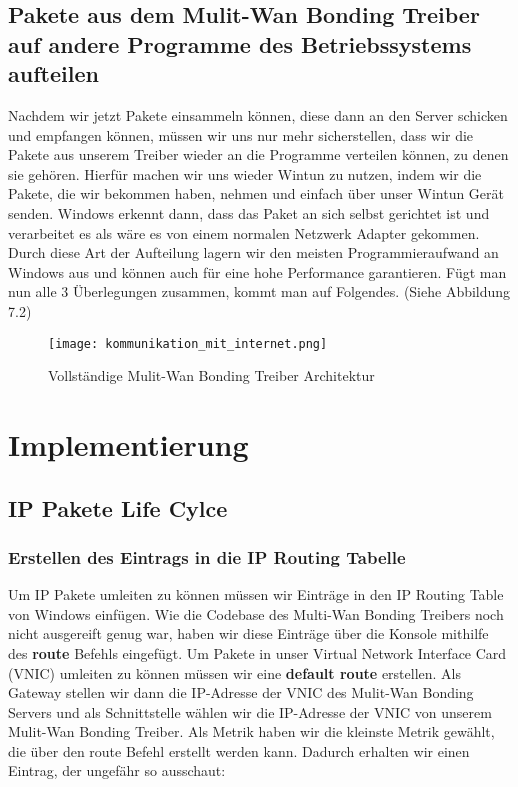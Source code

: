 \subsection{Pakete aus dem Mulit-Wan Bonding Treiber auf andere Programme des Betriebssystems aufteilen}
Nachdem wir jetzt Pakete einsammeln können, diese dann an den Server schicken und empfangen können, müssen wir uns nur mehr sicherstellen, dass wir die Pakete aus unserem Treiber wieder an die Programme verteilen können, zu denen sie gehören. 
\newline
\newline
Hierfür machen wir uns wieder Wintun zu nutzen, indem wir die Pakete, die wir bekommen haben, nehmen und einfach über unser Wintun Gerät senden. Windows erkennt dann, dass das Paket an sich selbst gerichtet ist und verarbeitet es als wäre es von einem normalen Netzwerk Adapter gekommen. Durch diese Art der Aufteilung lagern wir den meisten Programmieraufwand an Windows aus und können auch für eine hohe Performance garantieren.
\newpage
Fügt man nun alle 3 Überlegungen zusammen, kommt man auf Folgendes. (Siehe Abbildung 7.2)
\begin{figure}[H]
    \centering
    \texttt{[image: kommunikation\_mit\_internet.png]}
    \caption[Vollständige Mulit-Wan Bonding Treiber Architektur]{Vollständige Mulit-Wan Bonding Treiber Architektur} 
\end{figure}
\newpage
\section{Implementierung}
\subsection{IP Pakete Life Cylce}
\subsubsection{Erstellen des Eintrags in die IP Routing Tabelle}
Um IP Pakete umleiten zu können müssen wir Einträge in den IP Routing Table von Windows einfügen. Wie die Codebase des Multi-Wan Bonding Treibers noch nicht ausgereift genug war, haben wir diese Einträge über die Konsole mithilfe des \textbf{route} Befehls eingefügt. Um Pakete in unser Virtual Network Interface Card (VNIC) umleiten zu können müssen wir eine \textbf{default route} erstellen. Als Gateway stellen wir dann die IP-Adresse der VNIC des Mulit-Wan Bonding Servers und als Schnittstelle wählen wir die IP-Adresse der VNIC von unserem Mulit-Wan Bonding Treiber. Als Metrik haben wir die kleinste Metrik gewählt, die über den route Befehl erstellt werden kann. Dadurch erhalten wir einen Eintrag, der ungefähr so ausschaut:

